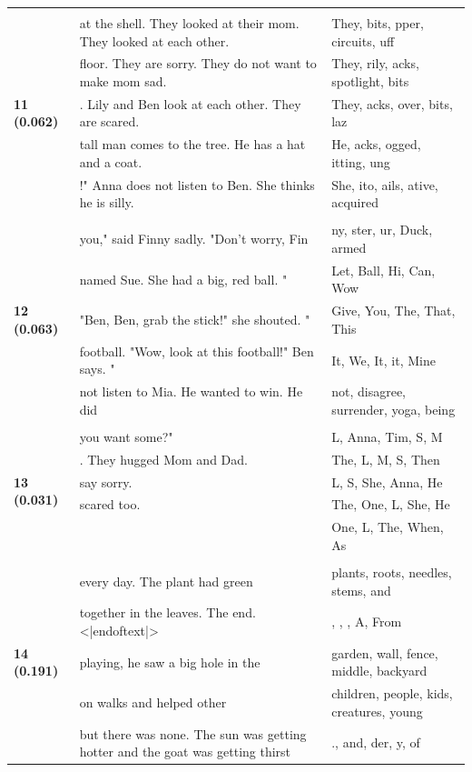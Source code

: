 \documentclass{article}
\theoremstyle{plain}
\theoremstyle{definition}
\theoremstyle{remark}
\begin{document}
\begin{longtable}{|p{}|p{}|p{}|}
& & \\
\multirow{5}{*}{\textbf{11 (0.062)}} & at the shell. They looked at their mom. They looked at each other. & They, bits, pper,  circuits, uff \\
& floor. They are sorry. They do not want to make mom sad. & They, rily, acks,  spotlight, bits \\
& .  Lily and Ben look at each other. They are scared. & They, acks, over, bits,  laz \\
& tall man comes to the tree. He has a hat and a coat. & He, acks, ogged, itting, ung \\
& !"  Anna does not listen to Ben. She thinks he is silly. & She, ito, ails, ative,  acquired \\
& & \\
\multirow{5}{*}{\textbf{12 (0.063)}} & you," said Finny sadly.  "Don't worry, Fin & ny, ster, ur,  Duck, armed \\
& named Sue. She had a big, red ball. " & Let, Ball, Hi, Can, Wow \\
& "Ben, Ben, grab the stick!" she shouted. " & Give, You, The, That, This \\
& football.  "Wow, look at this football!" Ben says. " & It, We,  It,  it, Mine \\
& not listen to Mia. He wanted to win. He did & not,  disagree,  surrender,  yoga,  being \\
& & \\
\multirow{5}{*}{\textbf{13 (0.031)}} & you want some?" & L, Anna, Tim, S, M \\
& . They hugged Mom and Dad. & The, L, M, S, Then \\
& say sorry. & L, S, She, Anna, He \\
& scared too. & The, One, L, She, He \\
&  & One, L, The, When, As \\
& & \\
\multirow{5}{*}{\textbf{14 (0.191)}} & every day. The plant had green & plants,  roots,  needles,  stems,  and \\
& together in the leaves. The end.<|endoftext|> & ,   ,  ,  A,  From \\
& playing, he saw a big hole in the & garden,  wall,  fence,  middle,  backyard \\
& on walks and helped other & children,  people,  kids,  creatures,  young \\
& but there was none. The sun was getting hotter and the goat was getting thirst & .,  and, der, y,  of \\

\end{longtable}
\end{document}
